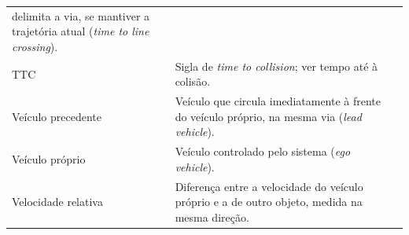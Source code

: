 {\begin{longtable}{@{}L{4.4cm}VL{10.0cm}@{}}
      delimita a via, se mantiver a trajetória atual (\emph{time to line
      crossing}). \\ \linhasep
  TTC
    & Sigla de \emph{time to collision}; ver tempo até à colisão. \\ \linhasep
  Veículo precedente
    & Veículo que circula imediatamente à frente do veículo próprio, na
      mesma via (\emph{lead vehicle}). \\ \linhasep
  Veículo próprio
    & Veículo controlado pelo sistema (\emph{ego vehicle}). \\ \linhasep
  Velocidade relativa
    & Diferença entre a velocidade do veículo próprio e a de outro objeto,
      medida na mesma direção. \\
\end{longtable}
}
